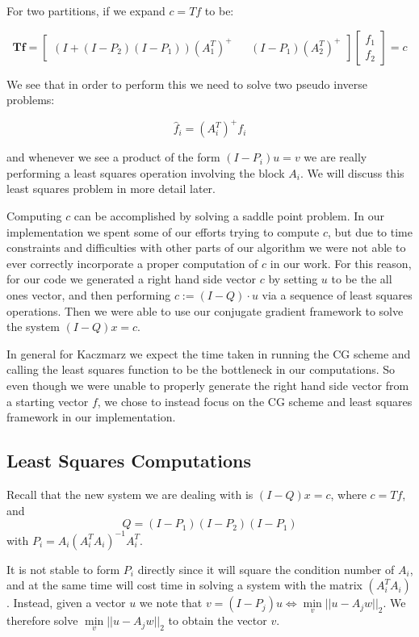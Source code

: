 \documentclass[a4paper,12pt]{article}
\begin{document}
 For two partitions, if we expand $c = Tf$ to be:
 
 $$\textbf{Tf} = \begin{bmatrix} (I + (I-P_2)(I-P_1))(A_1^T)^+ && (I-P_1)(A_2^T)^+ \end{bmatrix} \begin{bmatrix} f_1  \\ f_2 \end{bmatrix}= c $$
 
 We see that in order to perform this we need to solve two pseudo inverse problems:
 
 $$\hat{f}_i = (A_i^T)^+f_i$$
 
 and whenever we see a product of the form $(I-P_i)u = v$ we are really performing a least squares operation involving the block $A_i$. We will discuss this least squares problem in more detail later.
 
Computing $c$ can be accomplished by solving a saddle point problem. In our implementation we spent some of our efforts trying to compute $c$, but due to time constraints and difficulties with other parts of our algorithm we were not able to ever correctly incorporate a proper computation of $c$ in our work. For this reason, for our code we generated a right hand side vector $c$ by setting $u$ to be the all ones vector, and then performing $c := (I-Q)\cdot u$ via a sequence of least squares operations. Then we were able to use our conjugate gradient framework to solve the system $(I-Q)x = c.$ 

In general for Kaczmarz we expect the time taken in running the CG scheme and calling the least squares function to be the bottleneck in our computations. So even though we were unable to properly generate the right hand side vector from a starting vector $f$, we chose to instead focus on the CG scheme and least squares framework in our implementation. 
 

\subsection{Least Squares Computations}
Recall that the new system we are dealing with is $(I-Q)x = c$, where $c = Tf$, and $$Q=(I-P_{1})(I-P_{2})(I-P_{1})$$
 with $P_{i}=A_{i}(A_{i}^{T}A_{i})^{-1}A_{i}^{T}$.

It is not stable to form $P_{i}$ directly since it will square the condition number of $A_{i}$, and at the same time will cost time in solving a system with the matrix $(A^{T}_{i}A_{i})$. Instead, given a vector $u$ we note that $v=(I-P_{j})u \Leftrightarrow \min\limits_{v}||u-A_{j}w||_{2}$. We therefore solve $\min\limits_{v}||u-A_{j}w||_{2}$ to obtain the vector $v$. 
\end{document}
